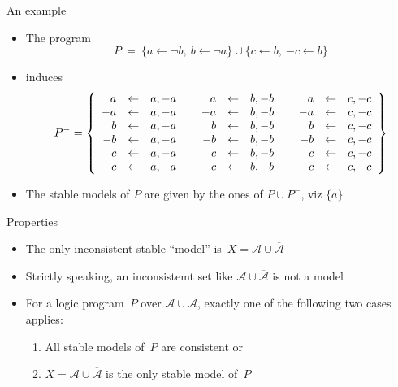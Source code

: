 \begin{frame}{An example}
  \begin{itemize}
  \item <1-> The program
    \[
    P
    \ =\
    \{ a \leftarrow {\neg b}, \ b \leftarrow {\neg a}\}
    \cup
    \{c\leftarrow b,\ {-c}\leftarrow b\}
    \]
  \item<2-> [] induces
    \[
    P^-
    =
    \left\{
      \begin{array}{rclp{2pt}rclp{2pt}rcl}
          a &\leftarrow& a,{-a} &&  a &\leftarrow& b,{-b} &&  a &\leftarrow& c,{-c}\\
        {-a}&\leftarrow& a,{-a} &&{-a}&\leftarrow& b,{-b} &&{-a}&\leftarrow& c,{-c}\\
          b &\leftarrow& a,{-a} &&  b &\leftarrow& b,{-b} &&  b &\leftarrow& c,{-c}\\
        {-b}&\leftarrow& a,{-a} &&{-b}&\leftarrow& b,{-b} &&{-b}&\leftarrow& c,{-c}\\
          c &\leftarrow& a,{-a} &&  c &\leftarrow& b,{-b} &&  c &\leftarrow& c,{-c}\\
        {-c}&\leftarrow& a,{-a} &&{-c}&\leftarrow& b,{-b} &&{-c}&\leftarrow& c,{-c}\\
      \end{array}
    \right\}
    \]
  \item<3-> The stable models of $P$ are given by the ones of $P\cup P^-$, viz $\{a\}$
  \end{itemize}
\end{frame}
\begin{frame}{Properties}
  \bigskip
  \begin{itemize}
  \item The only inconsistent stable ``model'' is~$X=\mathcal{A}\cup\overline{\mathcal{A}}$
  \item <2->[] Strictly speaking,
    an inconsistemt set like $\mathcal{A}\cup\overline{\mathcal{A}}$ is not a model
    \medskip
  \item <3-> For a logic program~$P$ over $\mathcal{A}\cup\overline{\mathcal{A}}$,
    exactly one of the following two cases applies:
    \begin{enumerate}
    \item All stable models of~$P$ are consistent or
    \item $X=\mathcal{A}\cup\overline{\mathcal{A}}$ is the only stable model of~$P$
    \end{enumerate}
  \end{itemize}
\end{frame}

